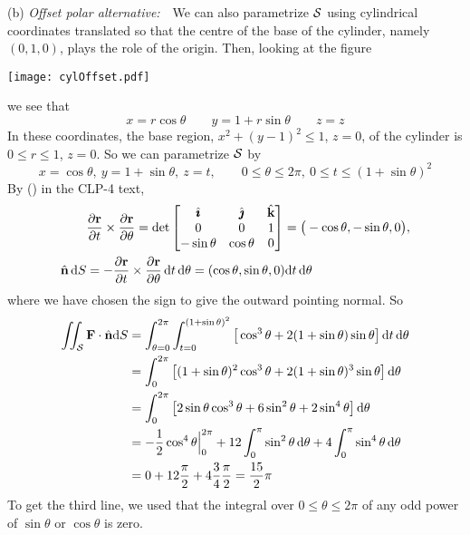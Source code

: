 \begin{solution}
(b) \emph{Offset polar alternative:}\ \ 
We can also parametrize $\mathcal{S}$ using cylindrical coordinates translated so that the centre of the base of the cylinder, namely $(0,1,0)$, plays the role of
the origin. Then, looking at the figure

\begin{center}
     \texttt{[image: cylOffset.pdf]}
\end{center}

we see that 
\begin{equation*}
x = r\cos\theta\qquad
y=1+r\sin\theta\qquad
z=z
\end{equation*}
In these coordinates, the base region, $x^2+(y-1)^2\le 1$, $z=0$, of
the cylinder is $0\le r\le 1$, $z=0$. So we can parametrize $\mathcal{S}$ by
$$
x = \cos\theta,\ y=1+\sin\theta,\ z=t,
\qquad
0\le\theta\le2\pi,\
0\le t\le (1+\sin\theta)^2
$$
By () in the CLP-4 text,
\begin{align*}
&\frac{\partial\vr}{\partial t}\times\pdiff{\vr}{\theta}
= \det\left[\begin{matrix} \hi & \hj & \hk \\
0 & 0 & 1 \\
-\sin\theta & \cos\theta & 0 \end{matrix}\right]
= \big(-\cos\theta, -\sin\theta, 0\big),
\\
\hn\,\dee{S} &= -\frac{\partial\vr}{\partial t}\times
            \pdiff{\vr}{\theta}\,\dee{t}\,\dee{\theta}
= (\cos\theta,\sin\theta,0)\dee{t}\,\dee{\theta}
\end{align*}
where we have chosen the sign to give the outward pointing normal.
So
\begin{align*}
\iint_{\mathcal{S}}\mathbf{F}\cdot \hat{\mathbf{n}}\mathrm{d}S
&= \int_{\theta=0}^{2\pi} \int_{t=0}^{(1+\sin\theta)^2}
\big[\cos^3\theta+2(1+\sin\theta)\sin\theta\big]\,\mathrm{d}t\,\mathrm{d}\theta \\
&= \int_0^{2\pi}
\big[ (1+\sin\theta)^2\cos^3\theta
+2(1+\sin\theta)^3\sin\theta\big]\,\mathrm{d}\theta \\
&= \int_0^{2\pi}
\big[ 2\sin\theta\cos^3\theta
+6\sin^2\theta+2\sin^4\theta\big]\,\mathrm{d}\theta \\
&=-\frac{1}{2}\cos^4\theta\Big|_0^{2\pi} 
   +12\int_0^\pi \sin^2\theta\,\mathrm{d}\theta
   +4\int_0^\pi \sin^4\theta\,\mathrm{d}\theta \\
&=0+12\frac{\pi}{2} +4\frac{3}{4}\frac{\pi}{2}
 = \frac{15}{2}\pi
\end{align*}
To get the third line, we used that the integral over $0\le\theta\le2\pi$
of any odd power of $\sin\theta$ or $\cos\theta$ is zero.
\end{solution}

